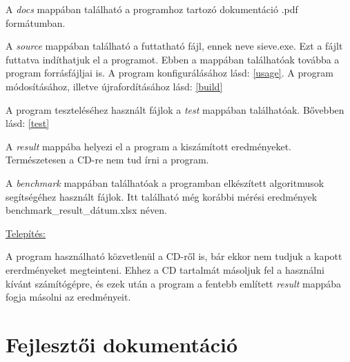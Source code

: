 \documentclass[twoside, a4paper, 12pt]{article}
\begin{document}
A \textit{docs} mappában található a programhoz tartozó dokumentáció .pdf formátumban. \par
A \textit{source} mappában található a futtatható fájl, ennek neve sieve.exe. Ezt a fájlt futtatva indíthatjuk el a programot. Ebben a mappában találhatóak továbba a program forrásfájljai is.  A program konfigurálásához lásd: \ref{usage}. A program módosításához, illetve újrafordításához lásd: \ref{build} \par
A program teszteléséhez használt fájlok a \textit{test} mappában találhatóak. Bővebben lásd: \ref{test} \par
A \textit{result} mappába helyezi el a program a kiszámított eredményeket. Természetesen a CD-re nem tud írni a program. \par
A \textit{benchmark} mappában találhatóak a programban elkészített algoritmusok segítségéhez használt fájlok. Itt található még korábbi mérési eredmények benchmark\_result\_dátum.xlsx néven. \bigskip

\noindent \underline{Telepítés:} \par
A program használható közvetlenül a CD-ről is, bár ekkor nem tudjuk a kapott ererdményeket megteinteni. Ehhez a CD tartalmát másoljuk fel a használni kívánt számítógépre, és ezek után a program a fentebb említett \textit{result} mappába fogja másolni az eredményeit.

\clearpage
\section{Fejlesztői dokumentáció}
\end{document}
